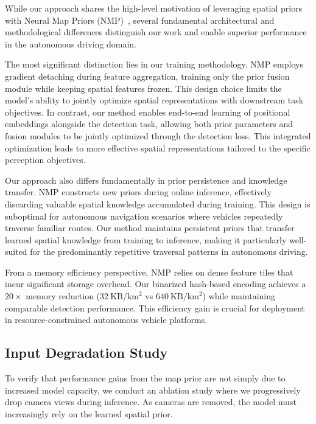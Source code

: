 \documentclass{article} %
\begin{document}
While our approach shares the high-level motivation of leveraging spatial priors with Neural Map Priors (NMP)~\cite{xiong2023neural}, several fundamental architectural and methodological differences distinguish our work and enable superior performance in the autonomous driving domain.

The most significant distinction lies in our training methodology.
NMP employs gradient detaching during feature aggregation, training only the prior fusion module while keeping spatial features frozen.
This design choice limits the model's ability to jointly optimize spatial representations with downstream task objectives.
In contrast, our method enables end-to-end learning of positional embeddings alongside the detection task, allowing both prior parameters and fusion modules to be jointly optimized through the detection loss.
This integrated optimization leads to more effective spatial representations tailored to the specific perception objectives.

Our approach also differs fundamentally in prior persistence and knowledge transfer.
NMP constructs new priors during online inference, effectively discarding valuable spatial knowledge accumulated during training.
This design is suboptimal for autonomous navigation scenarios where vehicles repeatedly traverse familiar routes.
Our method maintains persistent priors that transfer learned spatial knowledge from training to inference, making it particularly well-suited for the predominantly repetitive traversal patterns in autonomous driving.

From a memory efficiency perspective, NMP relies on dense feature tiles that incur significant storage overhead.
Our binarized hash-based encoding achieves a $20\times$ memory reduction ($32~\text{KB}/\text{km}^2$ vs $640~\text{KB}/\text{km}^2$) while maintaining comparable detection performance.
This efficiency gain is crucial for deployment in resource-constrained autonomous vehicle platforms.

\subsection{Input Degradation Study}

To verify that performance gains from the map prior are not simply due to increased model capacity, we conduct an ablation study where we progressively drop camera views during inference.
As cameras are removed, the model must increasingly rely on the learned spatial prior.
\end{document}
